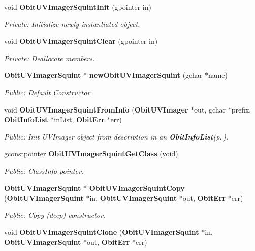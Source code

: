 \begin{CompactItemize}
\item 
void {\bf Obit\-UVImager\-Squint\-Init} (gpointer in)
\begin{CompactList}\small\item\em Private: Initialize newly instantiated object. \item\end{CompactList}\item 
void {\bf Obit\-UVImager\-Squint\-Clear} (gpointer in)
\begin{CompactList}\small\item\em Private: Deallocate members. \item\end{CompactList}\item 
{\bf Obit\-UVImager\-Squint} $\ast$ {\bf new\-Obit\-UVImager\-Squint} (gchar $\ast$name)
\begin{CompactList}\small\item\em Public: Default Constructor. \item\end{CompactList}\item 
void {\bf Obit\-UVImager\-Squint\-From\-Info} ({\bf Obit\-UVImager} $\ast$out, gchar $\ast$prefix, {\bf Obit\-Info\-List} $\ast$in\-List, {\bf Obit\-Err} $\ast$err)
\begin{CompactList}\small\item\em Public: Init UVImager object from description in an {\bf Obit\-Info\-List}{\rm (p.\,\pageref{structObitInfoList})}. \item\end{CompactList}\item 
gconstpointer {\bf Obit\-UVImager\-Squint\-Get\-Class} (void)
\begin{CompactList}\small\item\em Public: Class\-Info pointer. \item\end{CompactList}\item 
{\bf Obit\-UVImager\-Squint} $\ast$ {\bf Obit\-UVImager\-Squint\-Copy} ({\bf Obit\-UVImager\-Squint} $\ast$in, {\bf Obit\-UVImager\-Squint} $\ast$out, {\bf Obit\-Err} $\ast$err)
\begin{CompactList}\small\item\em Public: Copy (deep) constructor. \item\end{CompactList}\item 
void {\bf Obit\-UVImager\-Squint\-Clone} ({\bf Obit\-UVImager\-Squint} $\ast$in, {\bf Obit\-UVImager\-Squint} $\ast$out, {\bf Obit\-Err} $\ast$err)

\end{CompactItemize}
